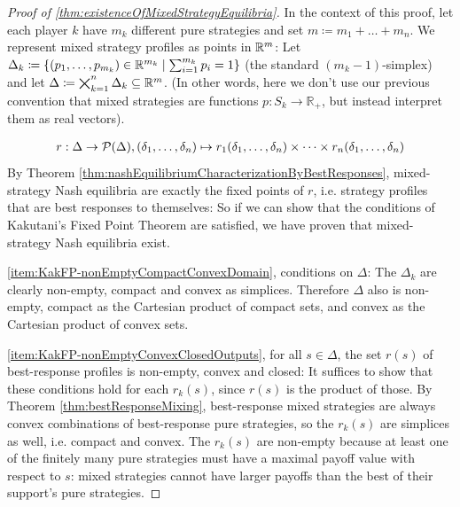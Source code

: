 \documentclass[a4paper]{scrreprt}
\newcommand{\Rp}{\mathbb{R}_+}
\begin{document}
    \begin{proof}[Proof of \ref{thm:existenceOfMixedStrategyEquilibria}]
        In the context of this proof, let each player $k$ have $m_k$ different pure strategies and set $m \coloneqq m_1 + \dots + m_n$.
        We represent mixed strategy profiles as points in $\mathbb{R}^m$: Let $\Delta_k \coloneqq \{(p_1, \dots, p_{m_k}) \in \mathbb{R}^{m_k} \mid \sum_{i=1}^{m_k} p_i = 1\}$ (the standard $(m_k - 1)$-simplex) and let $\Delta \coloneqq \bigtimes_{k=1}^n \Delta_k \subseteq \mathbb{R}^m$. (In other words, here we don't use our previous convention that mixed strategies are functions $p: S_k \to \Rp$, but instead interpret them as real vectors).
        
        \begin{gather}
            r: \Delta \to \operatorname{\mathcal{P}}(\Delta), (\delta_1, \dots, \delta_n) \mapsto r_1(\delta_1, \dots, \delta_n) \times \dots \times r_n(\delta_1, \dots, \delta_n)
            \label{eq:bestResponseCorresponenceDefinition}
        \end{gather}
        By Theorem \ref{thm:nashEquilibriumCharacterizationByBestResponses}, mixed-strategy Nash equilibria are exactly the fixed points of $r$, i.e. strategy profiles that are best responses to themselves: So if we can show that the conditions of Kakutani's Fixed Point Theorem are satisfied, we have proven that mixed-strategy Nash equilibria exist.
        
        \ref{item:KakFP-nonEmptyCompactConvexDomain}, conditions on $\Delta$: The $\Delta_k$ are clearly non-empty, compact and convex as simplices. Therefore $\Delta$ also is non-empty,
        compact as the Cartesian product of compact sets, and convex as the Cartesian product of convex sets. %
        
        \ref{item:KakFP-nonEmptyConvexClosedOutputs}, for all $s \in \Delta$, the set $r(s)$ of best-response profiles is non-empty, convex and closed: It suffices to show that these conditions hold for each $r_k(s)$, since $r(s)$ is the product of those. By Theorem \ref{thm:bestResponseMixing}, best-response mixed strategies are always convex combinations of best-response pure strategies, so the $r_k(s)$ are simplices as well, i.e. compact and convex. The $r_k(s)$ are non-empty because at least one of the finitely many pure strategies must have a maximal payoff value with respect to $s$: mixed strategies cannot have larger payoffs than the best of their support's pure strategies.
        

\end{proof}
\end{document}
